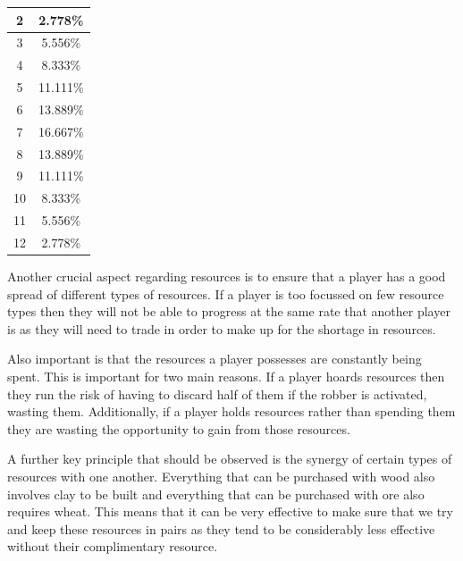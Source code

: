 \documentclass[]{article}
\begin{document}
\vspace{0.2cm}

\begin{center}


\begin{tabular}{|c|c|}
\hline 
2 & 2.778\% \\
\hline 
3 & 5.556\%\\
\hline 
4 & 8.333\% \\
\hline 
5 & 11.111\% \\
\hline 
6 & 13.889\% \\
\hline 
7 & 16.667\% \\
\hline 
8 & 13.889\% \\
\hline 
9 & 11.111\% \\
\hline 
10 & 8.333\% \\
\hline 
11 & 5.556\% \\
\hline 
12 &2.778\% \\
\hline 
\end{tabular}
\end{center}

\vspace{0.2cm}

\par Another   crucial aspect regarding resources is to ensure that a player has a good spread of different types of resources. If a player is too focussed on few resource types then they will not be able to progress at the same rate that another player is as they will need to trade in order to make up for the shortage in resources.

\par Also important is that the resources a player possesses are constantly being spent. This is important for two main reasons. If a player hoards resources then they run the risk of having to discard half of them if the robber is activated, wasting them. Additionally, if a player holds resources rather than spending them they are wasting the opportunity to gain from those resources. 

\par A further key principle that should be observed is the synergy of certain types of resources with one another. Everything that can be purchased with wood also involves clay to be built and everything that can be purchased with ore also requires wheat. This means that it can be very effective to make sure that we try and keep these resources in pairs as they tend to be considerably less effective without their complimentary resource.
\end{document}
